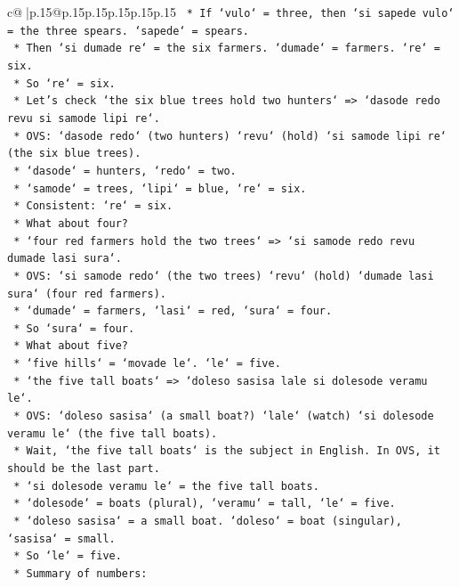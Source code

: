 \documentclass{article}
\begin{document}
{\begin{supertabular}{c@{$\;$}|p{.15\linewidth}@{}p{.15\linewidth}p{.15\linewidth}p{.15\linewidth}p{.15\linewidth}p{.15\linewidth}}
{{{\texttt{    *   If `vulo` = three, then `si sapede vulo` = the three spears. `sapede` = spears.} \\
\texttt{    *   Then `si dumade re` = the six farmers. `dumade` = farmers. `re` = six.} \\
\texttt{    *   So `re` = six.} \\
\texttt{    *   Let's check `the six blue trees hold two hunters` => `dasode redo revu si samode lipi re`.} \\
\texttt{    *   OVS: `dasode redo` (two hunters) `revu` (hold) `si samode lipi re` (the six blue trees).} \\
\texttt{    *   `dasode` = hunters, `redo` = two.} \\
\texttt{    *   `samode` = trees, `lipi` = blue, `re` = six.} \\
\texttt{    *   Consistent: `re` = six.} \\
\texttt{    *   What about four?} \\
\texttt{    *   `four red farmers hold the two trees` => `si samode redo revu dumade lasi sura`.} \\
\texttt{    *   OVS: `si samode redo` (the two trees) `revu` (hold) `dumade lasi sura` (four red farmers).} \\
\texttt{    *   `dumade` = farmers, `lasi` = red, `sura` = four.} \\
\texttt{    *   So `sura` = four.} \\
\texttt{    *   What about five?} \\
\texttt{    *   `five hills` = `movade le`. `le` = five.} \\
\texttt{    *   `the five tall boats` => `doleso sasisa lale si dolesode veramu le`.} \\
\texttt{    *   OVS: `doleso sasisa` (a small boat?) `lale` (watch) `si dolesode veramu le` (the five tall boats).} \\
\texttt{    *   Wait, `the five tall boats` is the subject in English. In OVS, it should be the last part.} \\
\texttt{    *   `si dolesode veramu le` = the five tall boats.} \\
\texttt{    *   `dolesode` = boats (plural), `veramu` = tall, `le` = five.} \\
\texttt{    *   `doleso sasisa` = a small boat. `doleso` = boat (singular), `sasisa` = small.} \\
\texttt{    *   So `le` = five.} \\
\texttt{    *   Summary of numbers:} \\
}}}
\end{supertabular}}
\end{document}
